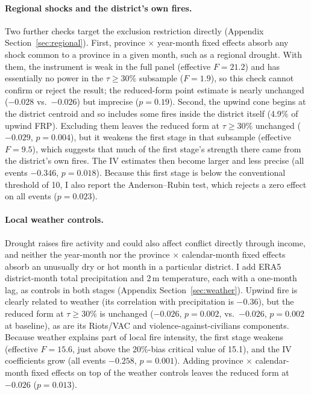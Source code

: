 \documentclass[12pt]{article}
\begin{document}
\paragraph{Regional shocks and the district's own fires.} Two further checks target the exclusion restriction directly (Appendix Section~\ref{sec:regional}). First, province $\times$ year-month fixed effects absorb any shock common to a province in a given month, such as a regional drought. With them, the instrument is weak in the full panel (effective $F = 21.2$) and has essentially no power in the $\tau \geq 30\%$ subsample ($F = 1.9$), so this check cannot confirm or reject the result; the reduced-form point estimate is nearly unchanged ($-0.028$ vs.\ $-0.026$) but imprecise ($p=0.19$). Second, the upwind cone begins at the district centroid and so includes some fires inside the district itself (4.9\% of upwind FRP). Excluding them leaves the reduced form at $\tau \geq 30\%$ unchanged ($-0.029$, $p=0.004$), but it weakens the first stage in that subsample (effective $F = 9.5$), which suggests that much of the first stage's strength there came from the district's own fires. The IV estimates then become larger and less precise (all events $-0.346$, $p=0.018$). Because this first stage is below the conventional threshold of 10, I also report the Anderson--Rubin test, which rejects a zero effect on all events ($p=0.023$).

\paragraph{Local weather controls.} Drought raises fire activity and could also affect conflict directly through income, and neither the year-month nor the province $\times$ calendar-month fixed effects absorb an unusually dry or hot month in a particular district. I add ERA5 district-month total precipitation and 2\,m temperature, each with a one-month lag, as controls in both stages (Appendix Section~\ref{sec:weather}). Upwind fire is clearly related to weather (its correlation with precipitation is $-0.36$), but the reduced form at $\tau \geq 30\%$ is unchanged ($-0.026$, $p=0.002$, vs.\ $-0.026$, $p=0.002$ at baseline), as are its Riots/VAC and violence-against-civilians components. Because weather explains part of local fire intensity, the first stage weakens (effective $F = 15.6$, just above the 20\%-bias critical value of 15.1), and the IV coefficients grow (all events $-0.258$, $p=0.001$). Adding province $\times$ calendar-month fixed effects on top of the weather controls leaves the reduced form at $-0.026$ ($p=0.013$).
\end{document}
